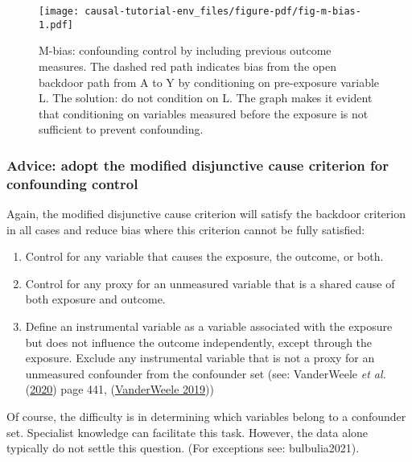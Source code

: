 \documentclass[
  singlecolumn]{article}
\providecommand{\tightlist}{%
  \setlength{\itemsep}{0pt}\setlength{\parskip}{0pt}}\usepackage{longtable,booktabs,array}
\begin{document}
\begin{figure}

{\centering \texttt{[image: causal-tutorial-env\_files/figure-pdf/fig-m-bias-1.pdf]}

}

\caption{\label{fig-m-bias}M-bias: confounding control by including
previous outcome measures. The dashed red path indicates bias from the
open backdoor path from A to Y by conditioning on pre-exposure variable
L. The solution: do not condition on L. The graph makes it evident that
conditioning on variables measured before the exposure is not sufficient
to prevent confounding.}

\end{figure}

\hypertarget{advice-adopt-the-modified-disjunctive-cause-criterion-for-confounding-control}{%
\subsubsection{Advice: adopt the modified disjunctive cause criterion
for confounding
control}\label{advice-adopt-the-modified-disjunctive-cause-criterion-for-confounding-control}}

Again, the modified disjunctive cause criterion will satisfy the
backdoor criterion in all cases and reduce bias where this criterion
cannot be fully satisfied:

\begin{enumerate}
\def\labelenumi{\alph{enumi}.}
\tightlist
\item
  Control for any variable that causes the exposure, the outcome, or
  both.
\item
  Control for any proxy for an unmeasured variable that is a shared
  cause of both exposure and outcome.
\item
  Define an instrumental variable as a variable associated with the
  exposure but does not influence the outcome independently, except
  through the exposure. Exclude any instrumental variable that is not a
  proxy for an unmeasured confounder from the confounder set (see:
  VanderWeele \emph{et al.}
  (\protect\hyperlink{ref-vanderweele2020}{2020}) page 441,
  (\protect\hyperlink{ref-vanderweele2019}{VanderWeele 2019}))
\end{enumerate}

Of course, the difficulty is in determining which variables belong to a
confounder set. Specialist knowledge can facilitate this task. However,
the data alone typically do not settle this question. (For exceptions
see: bulbulia2021).
\end{document}
